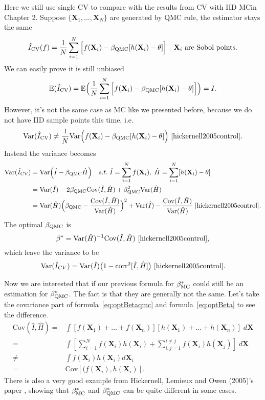 Here we still use single CV to compare with the results from CV with IID MCin Chapter 2. 
Suppose $\{\mathbf{X}_1, \dots, \mathbf{X}_N\}$ are generated by QMC rule, the estimator stays the same
\[
    \hat{I}_{\mathrm{CV}}(f)=\frac{1}{N}\sum_{i=1}^{N}\Big[ f(\mathbf{\mathbf{X}}_i)-\beta_{\mathrm{QMC}} [h(\mathbf{X}_i)-\theta] \Big] \quad \mathbf{X}_i \text{ are Sobol points}.
\]
We can easily prove it is still unbiased
\[
\mathbb{E}(\hat{I}_{\mathrm{CV}})=\mathbb{E}\Big(\frac{1}{N}\sum_{i=1}^{N}\Big[f(\mathbf{X}_i)-\beta_{\mathrm{QMC}}[h(\mathbf{X}_i)-\theta] \Big] \Big)=I.
\]
However, it's not the same case as MC like we presented before, because we do not have IID sample points this time, i.e.
\[
    \mathrm{Var}(\hat{I}_{\mathrm{CV}}) \not=\frac{1}{N}\mathrm{Var}\Big(f(\mathbf{X}_i)-\beta_{\mathrm{QMC}}[h(\mathbf{X}_i)-\theta]\Big) \text{ \cite{hickernell2005control}}.
\]
Instead the variance becomes
\begin{align*}
    \mathrm{Var}(\hat{I}_{\mathrm{CV}})  
    &=\mathrm{Var}\Big( \hat{I}- \beta_{\mathrm{QMC}} \hat{H}\Big)
    \quad s.t.\; \hat{I}=\sum_{i=1}^{N}f(\mathbf{X}_i),\; \hat{H}=\sum_{i=1}^{N}[h(\mathbf{X}_i)-\theta]\\
    &=\mathrm{Var}(\hat{I})-2\beta_{\mathrm{QMC}} \mathrm{Cov}(\hat{I},\hat{H})+\beta_{\mathrm{QMC}}^2\mathrm{Var}(\hat{H})\\
    &=\mathrm{Var}(\hat{H})\Big(\beta_{\mathrm{QMC}} -\frac{\mathrm{Cov}(\hat{I},\hat{H})}{\mathrm{Var}(\hat{H})}\Big)^2+\mathrm{Var}(\hat{I})-\frac{\mathrm{Cov}(\hat{I},\hat{H})}{\mathrm{Var}(\hat{H})}\text{ \cite{hickernell2005control}}.
\end{align*}
The optimal $\beta_{\mathrm{QMC}}$ is
\begin{equation}
    \beta_{}^*= \mathrm{Var} (\hat{H})^{-1}\mathrm{Cov} (\hat{I}, \hat{H}) \text{ \cite{hickernell2005control}},
    \label{eq:optBetaqmc}
\end{equation}
which leave the variance to be
\[
    \mathrm{Var}(\hat{I}_{CV})=\mathrm{Var}(\hat{I})\big(1-\mathrm{corr}^2[\hat{I}, \hat{H}]\big) \text{ \cite{hickernell2005control}}.
\]

Now we are interested that if our previous formula for $\beta_{\mathrm{MC}}^*$ could still be an estimation for $\beta_{\mathrm{QMC}}^*$. The fact is that they are generally not the same. Let's take the covariance part of formula~\eqref{eq:optBetaqmc} and formula~\eqref{eq:optBeta} to see the difference. 
\begin{align*}
    \mathrm{Cov}(\hat{I}, \hat{H})=&\int [f(\mathbf{X}_1)+\dots+f(\mathbf{X}_n)][h(\mathbf{X}_1)+\dots+h(\mathbf{X}_n)]\; d\mathbf{\mathbf{X}}\\
    =&\int [\sum_{i=1}^{N}f(\mathbf{X}_i)h(\mathbf{X}_i) + \sum_{i,j=1}^{i\neq j}f(\mathbf{X}_i)h(\mathbf{X}_j)]\; d\mathbf{\mathbf{X}}\\
    \neq&\int f(\mathbf{X}_i)h(\mathbf{X}_i)d\mathbf{X}_i\\
    =&\mathrm{Cov}[(f(\mathbf{X}_i),h(\mathbf{X}_i)].
\end{align*}
There is also a very good example from Hickernell, Lemieux and Owen (2005)'s paper \cite{hickernell2005control}, showing that $\beta_{\mathrm{MC}}^*$ and $\beta_{\mathrm{QMC}}^*$ can be quite different in some cases. 

